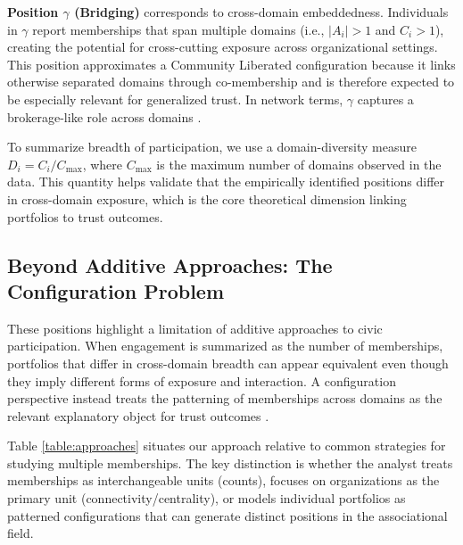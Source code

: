 \textbf{Position $\gamma$ (Bridging)} corresponds to cross-domain embeddedness. Individuals in $\gamma$ report memberships that span multiple domains (i.e., $|A_i|>1$ and $C_i>1$), creating the potential for cross-cutting exposure across organizational settings. This position approximates a Community Liberated configuration because it links otherwise separated domains through co-membership and is therefore expected to be especially relevant for generalized trust. In network terms, $\gamma$ captures a brokerage-like role across domains \parencite{burt_brokerage_2005}.

To summarize breadth of participation, we use a domain-diversity measure $D_i = C_i/C_{\max}$, where $C_{\max}$ is the maximum number of domains observed in the data. This quantity helps validate that the empirically identified positions differ in cross-domain exposure, which is the core theoretical dimension linking portfolios to trust outcomes.





\subsection{Beyond Additive Approaches: The Configuration Problem}

These positions highlight a limitation of additive approaches to civic participation. When engagement is summarized as the number of memberships, portfolios that differ in cross-domain breadth can appear equivalent even though they imply different forms of exposure and interaction. A configuration perspective instead treats the patterning of memberships across domains as the relevant explanatory object for trust outcomes \parencite{putnam_bowling_2000, coleman_social_1988}.

Table \ref{table:approaches} situates our approach relative to common strategies for studying multiple memberships. The key distinction is whether the analyst treats memberships as interchangeable units (counts), focuses on organizations as the primary unit (connectivity/centrality), or models individual portfolios as patterned configurations that can generate distinct positions in the associational field.

